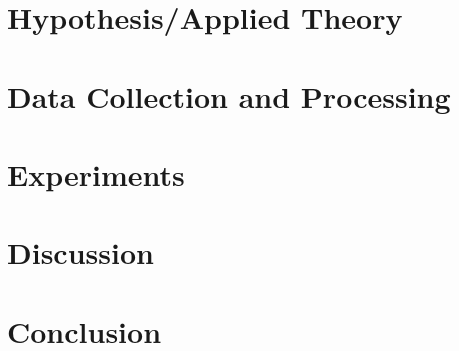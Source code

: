 \documentclass[12pt]{article}
\begin{document}
\section{Hypothesis/Applied Theory}


\section{Data Collection and Processing}


\section{Experiments}


\section{Discussion}


\section{Conclusion}


\printbibliography
\cleardoublepage
\appendix

\end{document}
